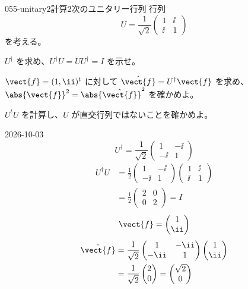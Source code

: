 \documentclass[uplatex,dvipdfmx,a4paper,11pt]{jsarticle}
\begin{document}
\begin{mondai}{055-unitary2}{計算}{2次のユニタリー行列}
行列
\[
U=\frac{1}{\sqrt{2}}\begin{pmatrix}1&\ii\\ \ii&1\end{pmatrix}
\]
を考える。
\begin{shoumon}
  \item $U^{\dagger}$ を求め、$U^{\dagger}U=UU^{\dagger}=I$ を示せ。
  \item $\vect{f}=(1,\ii)^{t}$ に対して $\hat{\vect{f}}=U^{\dagger}\vect{f}$ を求め、$\abs{\vect{f}}^{2}=\abs{\hat{\vect{f}}}^{2}$ を確かめよ。
  \item $U^{t}U$ を計算し、$U$ が直交行列ではないことを確かめよ。
\end{shoumon}
\begin{kotaeutsushi}{2026-10-03}
\[
  U^{\dagger}=\frac{1}{\sqrt{2}}\begin{pmatrix}1&-\ii\\-\ii&1\end{pmatrix}
\]
\begin{align*}
  U^{\dagger}U&=\frac{1}{2}\begin{pmatrix}1&-\ii\\-\ii&1\end{pmatrix}\begin{pmatrix}1&\ii\\\ii&1\end{pmatrix}\\
  &=\frac{1}{2}\begin{pmatrix}2&0\\0&2\end{pmatrix}=I
\end{align*}
\[
  \vect{f}=\begin{pmatrix}1\\\ii\end{pmatrix}
\]
\begin{align*}
  \hat{\vect{f}}&=\frac{1}{\sqrt{2}}\begin{pmatrix}1&-\ii\\-\ii&1\end{pmatrix}\begin{pmatrix}1\\\ii\end{pmatrix}\\
  &=\frac{1}{\sqrt{2}}\begin{pmatrix}2\\0\end{pmatrix}=\begin{pmatrix}\sqrt{2}\\0\end{pmatrix}

\end{align*}
\end{kotaeutsushi}
\end{mondai}
\end{document}
